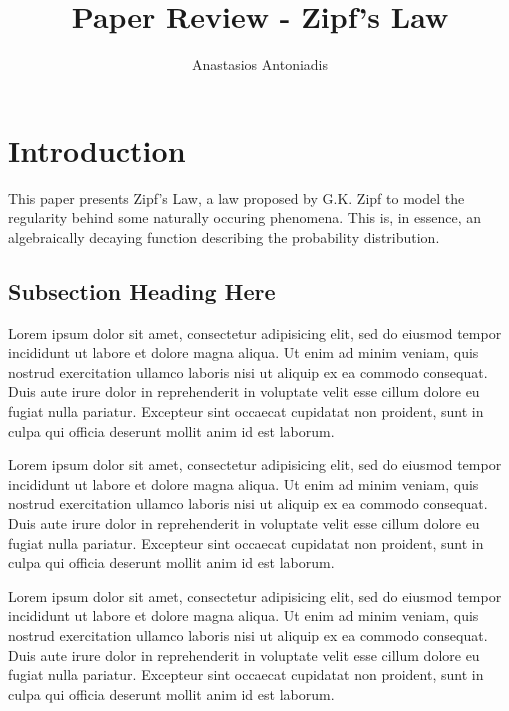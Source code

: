\documentclass{article}
\begin{document}
\title{Paper Review - Zipf's Law}
\author{Anastasios Antoniadis}

\maketitle


\section{Introduction}

This paper presents Zipf's Law, a law proposed by G.K. Zipf to model
the regularity behind some naturally occuring phenomena. This is, in
essence, an algebraically decaying function describing the probability
distribution.




\subsection{Subsection Heading Here}

Lorem ipsum dolor sit amet, consectetur adipisicing elit, sed do eiusmod tempor
incididunt ut labore et dolore magna aliqua. Ut enim ad minim veniam, quis
nostrud exercitation ullamco laboris nisi ut aliquip ex ea commodo consequat.
Duis aute irure dolor in reprehenderit in voluptate velit esse cillum dolore eu
fugiat nulla pariatur. Excepteur sint occaecat cupidatat non proident, sunt in
culpa qui officia deserunt mollit anim id est laborum.

Lorem ipsum dolor sit amet, consectetur adipisicing elit, sed do eiusmod tempor
incididunt ut labore et dolore magna aliqua. Ut enim ad minim veniam, quis
nostrud exercitation ullamco laboris nisi ut aliquip ex ea commodo consequat.
Duis aute irure dolor in reprehenderit in voluptate velit esse cillum dolore eu
fugiat nulla pariatur. Excepteur sint occaecat cupidatat non proident, sunt in
culpa qui officia deserunt mollit anim id est laborum.

Lorem ipsum dolor sit amet, consectetur adipisicing elit, sed do eiusmod tempor
incididunt ut labore et dolore magna aliqua. Ut enim ad minim veniam, quis
nostrud exercitation ullamco laboris nisi ut aliquip ex ea commodo consequat.
Duis aute irure dolor in reprehenderit in voluptate velit esse cillum dolore eu
fugiat nulla pariatur. Excepteur sint occaecat cupidatat non proident, sunt in
culpa qui officia deserunt mollit anim id est laborum.
\end{document}
